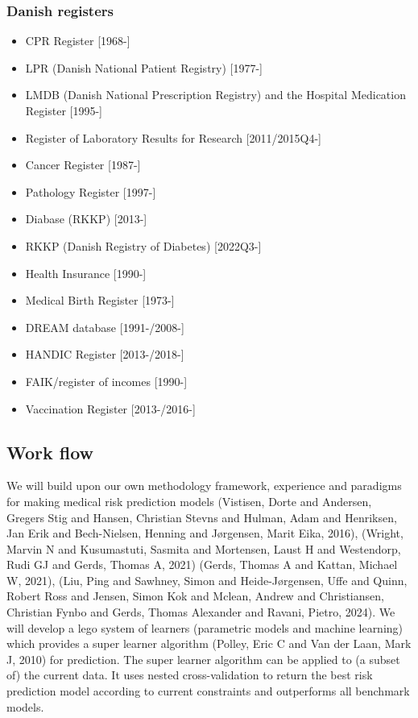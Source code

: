 \documentclass[11pt]{article}
\begin{document}
\subsubsection{Danish registers}
\label{sec:org66705e9}
\begin{itemize}
\item CPR Register [1968-]
\item LPR (Danish National Patient Registry) [1977-]
\item LMDB (Danish National Prescription Registry) and the Hospital Medication Register [1995-]
\item Register of Laboratory Results for Research [2011/2015Q4-]
\item Cancer Register [1987-]
\item Pathology Register [1997-]
\item Diabase (RKKP) [2013-]
\item RKKP (Danish Registry of Diabetes) [2022Q3-]
\item Health Insurance [1990-]
\item Medical Birth Register [1973-]
\item DREAM database [1991-/2008-]
\item HANDIC Register [2013-/2018-]
\item FAIK/register of incomes [1990-]
\item Vaccination Register [2013-/2016-]
\end{itemize}


\subsection{Work flow}
\label{sec:orga4e30bb}
We will build upon our own methodology framework, experience and paradigms for making medical risk prediction models (Vistisen, Dorte and Andersen, Gregers Stig and Hansen, Christian Stevns and Hulman, Adam and Henriksen, Jan Erik and Bech-Nielsen, Henning and J{\o}rgensen, Marit Eika, 2016), (Wright, Marvin N and Kusumastuti, Sasmita and Mortensen, Laust H and Westendorp, Rudi GJ and Gerds, Thomas A, 2021) (Gerds, Thomas A and Kattan, Michael W, 2021), (Liu, Ping and Sawhney, Simon and Heide-J{\o}rgensen, Uffe and Quinn, Robert Ross and Jensen, Simon Kok and Mclean, Andrew and Christiansen, Christian Fynbo and Gerds, Thomas Alexander and Ravani, Pietro, 2024). We will develop a lego system of learners (parametric models and machine 
learning) which provides a super learner algorithm (Polley, Eric C and Van der Laan, Mark J, 2010) for prediction. The super learner algorithm can be applied to (a subset of) the current data. It uses nested cross-validation to return the best risk prediction model according to current constraints and outperforms all benchmark models.
\end{document}
